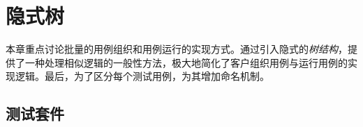 \begin{savequote}[45mm]
\end{savequote}

\chapter{隐式树} 
\label{ch:implicit-tree}

\begin{content}

本章重点讨论批量的用例组织和用例运行的实现方式。通过引入隐式的\emph{树结构}，提供了一种处理相似逻辑的一般性方法，极大地简化了客户组织用例与运行用例的实现逻辑。最后，为了区分每个测试用例，为其增加命名机制。

\end{content}

\section{测试套件}

